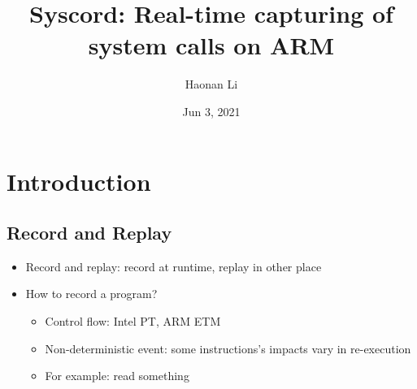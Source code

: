 \documentclass{ctexbeamer}
\title[Syscord]{Syscord: Real-time capturing of system calls on ARM }
\author[Haonan]{Haonan Li}
\institute[SUSTech]{Southern University of Science and Technology}
\date{Jun 3, 2021}
\begin{document}


\section{Introduction}
\subsection{Record and Replay}
\begin{frame}
  \begin{itemize}
    \item Record and replay: record at runtime, replay in other place
    \item How to record a program?
    \begin{itemize}
      \item Control flow: Intel PT, ARM ETM
      \item Non-deterministic event: some instructions's impacts vary in re-execution
      \item   For example: read something
    \end{itemize}
  \end{itemize}
\end{frame}
\end{document}
